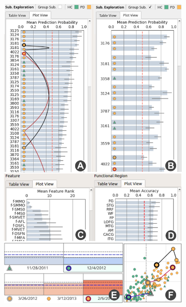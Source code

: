 \begin{figure}[t]
\centering
\includegraphics[width=0.85\textwidth]{images/plotView4.png}%

\end{figure}
